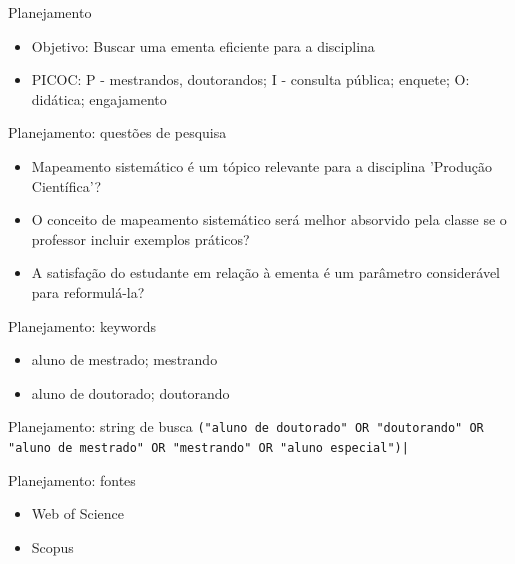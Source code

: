 \begin{frame}
\begin{block}{Planejamento}
\begin{itemize}
\item Objetivo: Buscar uma ementa eficiente para a disciplina
\item PICOC: P - mestrandos, doutorandos; I - consulta pública; enquete; O: didática; engajamento
\end{itemize}
\end{block}
\end{frame}

\begin{frame}
\begin{block}{Planejamento: questões de pesquisa}
\begin{itemize}
\item Mapeamento sistemático é um tópico relevante para a disciplina 'Produção Científica'?
\item O conceito de mapeamento sistemático será melhor absorvido pela classe se o professor incluir exemplos práticos?
\item A satisfação do estudante em relação à ementa é um parâmetro considerável para reformulá-la?
\end{itemize}
\end{block}
\end{frame}

\begin{frame}
\begin{block}{Planejamento: keywords}
\begin{itemize}
\item aluno de mestrado; mestrando
\item aluno de doutorado; doutorando
\end{itemize}
\end{block}

\begin{block}{Planejamento: string de busca}
\texttt{("aluno de doutorado" OR "doutorando" OR "aluno de mestrado" OR "mestrando" OR "aluno especial")|}
\end{block}

\begin{block}{Planejamento: fontes}
\begin{itemize}
\item Web of Science
\item Scopus
\end{itemize}
\end{block}
\end{frame}

